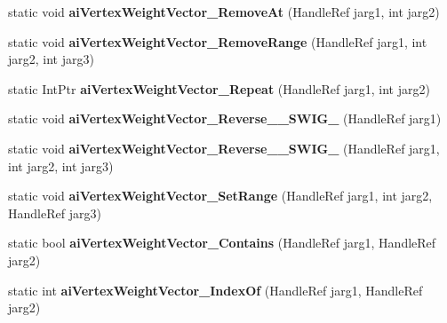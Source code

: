 \begin{DoxyCompactItemize}
\item 
\hypertarget{class_assimp_p_i_n_v_o_k_e_ab6cb89053257b242975ebb81b64f5deb}{static void {\bfseries ai\+Vertex\+Weight\+Vector\+\_\+\+Remove\+At} (Handle\+Ref jarg1, int jarg2)}\label{class_assimp_p_i_n_v_o_k_e_ab6cb89053257b242975ebb81b64f5deb}

\item 
\hypertarget{class_assimp_p_i_n_v_o_k_e_ac2420421944484e3e6604ddf3b85808d}{static void {\bfseries ai\+Vertex\+Weight\+Vector\+\_\+\+Remove\+Range} (Handle\+Ref jarg1, int jarg2, int jarg3)}\label{class_assimp_p_i_n_v_o_k_e_ac2420421944484e3e6604ddf3b85808d}

\item 
\hypertarget{class_assimp_p_i_n_v_o_k_e_a20788fb427efa194195b3bbd9c7a5978}{static Int\+Ptr {\bfseries ai\+Vertex\+Weight\+Vector\+\_\+\+Repeat} (Handle\+Ref jarg1, int jarg2)}\label{class_assimp_p_i_n_v_o_k_e_a20788fb427efa194195b3bbd9c7a5978}

\item 
\hypertarget{class_assimp_p_i_n_v_o_k_e_ad5ff42c4a67ec68b1d1abab2e9dbe830}{static void {\bfseries ai\+Vertex\+Weight\+Vector\+\_\+\+Reverse\+\_\+\+\_\+\+S\+W\+I\+G\+\_} (Handle\+Ref jarg1)}\label{class_assimp_p_i_n_v_o_k_e_ad5ff42c4a67ec68b1d1abab2e9dbe830}

\item 
\hypertarget{class_assimp_p_i_n_v_o_k_e_a310ce33bd2c4428fe17c6ef1cb6f3f42}{static void {\bfseries ai\+Vertex\+Weight\+Vector\+\_\+\+Reverse\+\_\+\+\_\+\+S\+W\+I\+G\+\_} (Handle\+Ref jarg1, int jarg2, int jarg3)}\label{class_assimp_p_i_n_v_o_k_e_a310ce33bd2c4428fe17c6ef1cb6f3f42}

\item 
\hypertarget{class_assimp_p_i_n_v_o_k_e_a9eeee3fd3cd8a0702cf9c8655e52e424}{static void {\bfseries ai\+Vertex\+Weight\+Vector\+\_\+\+Set\+Range} (Handle\+Ref jarg1, int jarg2, Handle\+Ref jarg3)}\label{class_assimp_p_i_n_v_o_k_e_a9eeee3fd3cd8a0702cf9c8655e52e424}

\item 
\hypertarget{class_assimp_p_i_n_v_o_k_e_a54cc6a641a2821b4cc17082ce4b5de43}{static bool {\bfseries ai\+Vertex\+Weight\+Vector\+\_\+\+Contains} (Handle\+Ref jarg1, Handle\+Ref jarg2)}\label{class_assimp_p_i_n_v_o_k_e_a54cc6a641a2821b4cc17082ce4b5de43}

\item 
\hypertarget{class_assimp_p_i_n_v_o_k_e_a2e5e5cfc475fdceb212221b5a2f9e0f4}{static int {\bfseries ai\+Vertex\+Weight\+Vector\+\_\+\+Index\+Of} (Handle\+Ref jarg1, Handle\+Ref jarg2)}\label{class_assimp_p_i_n_v_o_k_e_a2e5e5cfc475fdceb212221b5a2f9e0f4}


\end{DoxyCompactItemize}
